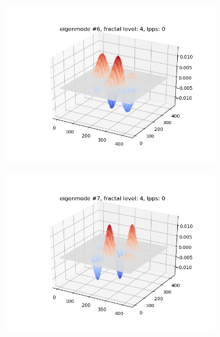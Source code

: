\documentclass{article}
\begin{document}
\begin{figure}
\begin{subfigure}{0.3\textwidth}
    \end{subfigure}
    \begin{subfigure}{0.3\textwidth}
        \includegraphics[width=\linewidth]{../figs/eigenmode_3d6.png}
    \end{subfigure}
    \begin{subfigure}{0.3\textwidth}
        \includegraphics[width=\linewidth]{../figs/eigenmode_3d7.png}
    \end{subfigure}
    \begin{subfigure}{0.3\textwidth}

\end{subfigure}
\end{figure}
\end{document}
